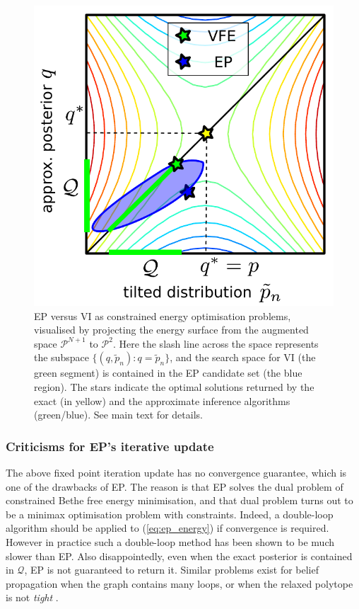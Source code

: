 \begin{figure}
\centering
\includegraphics[width=0.4\linewidth]{Chapter2/ep/energy.pdf}
\caption{EP versus VI as constrained energy optimisation problems, visualised by projecting the energy surface from the augmented space $\mathcal{P}^{N+1}$ to $\mathcal{P}^{2}$. Here the slash line across the space represents the subspace $\{ (q, \tilde{p}_n): q = \tilde{p}_n \}$, and the search space for VI (the green segment) is contained in the EP candidate set (the blue region). The stars indicate the optimal solutions returned by the exact (in yellow) and the approximate inference algorithms (green/blue). See main text for details.}
\label{fig:chap2_ep_vi_comparison}
\end{figure}

\subsubsection{Criticisms for EP's iterative update}
%
The above fixed point iteration update has no convergence guarantee, which is one of the drawbacks of EP. The reason is that EP solves the dual problem of constrained Bethe free energy minimisation, and that dual problem turns out to be a minimax optimisation problem with constraints. Indeed, a double-loop algorithm \citep{heskes:ep2002} should be applied to (\ref{eq:ep_energy}) if convergence is required. However in practice such a double-loop method has been shown to be much slower than EP. Also disappointedly, even when the exact posterior is contained in $\mathcal{Q}$, EP is not guaranteed to return it. Similar problems exist for belief propagation when the graph contains many loops, or when the relaxed polytope is not \emph{tight} \citep{wainwright:graphical2008}.



